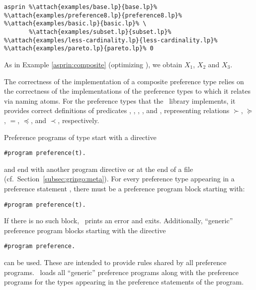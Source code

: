 \begin{example}
{  }
\begin{lstlisting}[numbers=none,escapechar=\%]
asprin %\attach{examples/base.lp}{base.lp}% %\attach{examples/preference8.lp}{preference8.lp}%  %\attach{examples/basic.lp}{basic.lp}% \
       %\attach{examples/subset.lp}{subset.lp}% %\attach{examples/less-cardinality.lp}{less-cardinality.lp}% %\attach{examples/pareto.lp}{pareto.lp}% 0
\end{lstlisting}
As in Example \ref{asprin:composite} (optimizing ), we obtain $X_1$, $X_2$ and $X_3$.
\end{example}

\begin{note}
The correctness of the implementation of a composite preference type relies on the 
correctness of the implementations of the preference types to which it relates via naming atoms.
For the preference types that the \asprin\ library implements,
it provides correct definitions of predicates 
, , , , and , 
representing relations $\succ$, $\succeq$, $=$, $\preceq$, and $\prec$, respectively. 
\end{note}


\begin{note}
Preference programs of type  start with a directive
\begin{lstlisting}[numbers=none]
#program preference(t).
\end{lstlisting}
and end with another program directive or at the end of a file
(cf.~Section~\ref{subsec:gringo:meta}).
For every preference type  appearing in a preference statement , 
there must be a preference program block starting with:
\begin{lstlisting}[numbers=none]
#program preference(t).
\end{lstlisting}
If there is no such block, \asprin\ prints an error and exits.
Additionally, ``generic'' preference program blocks starting with the directive
\begin{lstlisting}[numbers=none]
#program preference.
\end{lstlisting}
can be used. 
These are intended to provide rules shared by all preference programs.
\asprin\ loads all ``generic'' preference programs along with 
the preference programs for the types appearing in the preference statements of the program.
\end{note}

